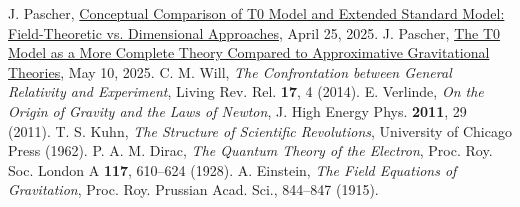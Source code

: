 \documentclass[12pt,a4paper]{article}
\begin{document}
\begin{thebibliography}{99}
		 J. Pascher, \href{https://github.com/jpascher/T0-Time-Mass-Duality/tree/main/2/pdf/English/T0vsESM_ConceptualAnalysisEn.pdf}{Conceptual Comparison of T0 Model and Extended Standard Model: Field-Theoretic vs. Dimensional Approaches}, April 25, 2025.
		 J. Pascher, \href{https://github.com/jpascher/T0-Time-Mass-Duality/tree/main/2/pdf/English/T0-ModelAsCompleteTheory_En.pdf}{The T0 Model as a More Complete Theory Compared to Approximative Gravitational Theories}, May 10, 2025.
		 C. M. Will, \textit{The Confrontation between General Relativity and Experiment}, Living Rev. Rel. \textbf{17}, 4 (2014).
		 E. Verlinde, \textit{On the Origin of Gravity and the Laws of Newton}, J. High Energy Phys. \textbf{2011}, 29 (2011).
		 T. S. Kuhn, \textit{The Structure of Scientific Revolutions}, University of Chicago Press (1962).
		 P. A. M. Dirac, \textit{The Quantum Theory of the Electron}, Proc. Roy. Soc. London A \textbf{117}, 610--624 (1928).
		 A. Einstein, \textit{The Field Equations of Gravitation}, Proc. Roy. Prussian Acad. Sci., 844--847 (1915).
	\end{thebibliography}
	
	
\end{document}
